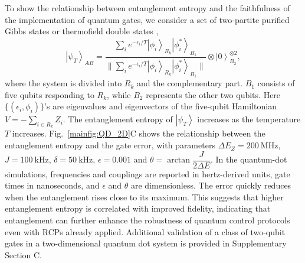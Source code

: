 \documentclass[12pt]{article}
\newcommand{\ket}[1]{\left|#1\right\rangle}
\begin{document}
To show the relationship between entanglement entropy and the faithfulness of the implementation of quantum gates, we consider a set of two-partite purified Gibbs states or thermofield double states \cite{cottrell2019build}, 
\begin{equation}
    \ket{\psi_T}_{AB}=\dfrac{\sum_ie^{-\epsilon_i/T}\ket{\phi_i}_{R_k}\ket{\phi^*_i}_{B_1}}{\|\sum_ie^{-\epsilon_i/T}\ket{\phi_i}_{R_k}\ket{\phi^*_i}_{B_1}\|}\otimes\ket{0}^{\otimes 2}_{B_2},\label{maineq:Gibbs}
\end{equation}
where the system is divided into $R_k$ and the complementary part. $B_1$ consists of five qubits responding to $R_k$, while $B_2$ represents the other two qubits. Here $\{(\epsilon_i,\phi_i)\}$'s are eigenvalues and eigenvectors of the five-qubit Hamiltonian $V=-\sum_{i\in R_k}Z_i$. 
The entanglement entropy of $\ket{\psi_T}$ increases as the temperature $T$ increases. 
Fig.~\ref{mainfig:QD_2D}C shows the relationship between the entanglement entropy and the gate error, with parameters $\Delta E_Z=200~\mathrm{MHz}$, $J=100~\mathrm{kHz}$, $\delta =50~\mathrm{kHz}$, $\epsilon=0.001$ and $\theta=\arctan\dfrac J{2\Delta E}$. In the quantum-dot simulations, frequencies and couplings are reported in hertz-derived units, gate times in nanoseconds, and $\epsilon$ and $\theta$ are dimensionless. The error quickly reduces when the entanglement rises close to its maximum. This suggests that higher entanglement entropy is correlated with improved fidelity, indicating that entanglement can further enhance the robustness of quantum control protocols even with RCPs already applied. Additional validation of a class of two-qubit gates in a two-dimensional quantum dot system is provided in Supplementary Section C.

 
\end{document}
